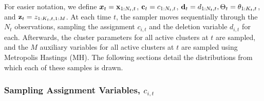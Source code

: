 \documentclass[twocolumn, final]{svjour3}
\begin{document}
For easier notation, we define $\boldsymbol{x}_{t} = \bold{x}_{1:N_{t},t}$, $\bold{c}_{t} = c_{1:N_{t},t}$, $\bold{d}_{t} = d_{1:N_{t},t}, \Theta_{t} = \theta_{1:K_{t}, t}$, and $\bold{z}_{t} = z_{1:K_{t},t,1:M}$.
At each time $t$, the sampler moves sequentially through the $N_{t}$ observations, sampling the assignment $c_{i,t}$ and the deletion variable $d_{i,t}$ for each. Afterwards, the cluster parameters for all active clusters at $t$ are sampled, and the $M$ auxiliary variables for all active clusters at $t$ are sampled using Metropolis Hastings (MH). The following sections detail the distributions from which each of these samples is drawn.



\subsubsection{Sampling Assignment Variables, $c_{i,t}$}
\label{sec:sample_assignments}
\end{document}
